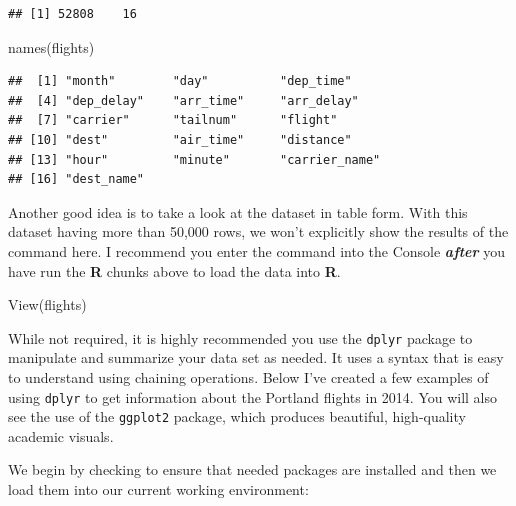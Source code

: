 \documentclass[print]{nuthesis}
\newenvironment{Shaded}{\begin{snugshade}}{\end{snugshade}}
\newcommand{\FunctionTok}[1]{\textcolor[rgb]{0.00,0.00,0.00}{#1}}
\newcommand{\NormalTok}[1]{#1}
\begin{document}
\begin{verbatim}
## [1] 52808    16
\end{verbatim}

\begin{Shaded}
\begin{Highlighting}[]
\FunctionTok{names}\NormalTok{(flights)}
\end{Highlighting}
\end{Shaded}

\begin{verbatim}
##  [1] "month"        "day"          "dep_time"    
##  [4] "dep_delay"    "arr_time"     "arr_delay"   
##  [7] "carrier"      "tailnum"      "flight"      
## [10] "dest"         "air_time"     "distance"    
## [13] "hour"         "minute"       "carrier_name"
## [16] "dest_name"
\end{verbatim}

Another good idea is to take a look at the dataset in table form. With this dataset having more than 50,000 rows, we won't explicitly show the results of the command here. I recommend you enter the command into the Console \textbf{\emph{after}} you have run the \textbf{R} chunks above to load the data into \textbf{R}.

\begin{Shaded}
\begin{Highlighting}[]
\FunctionTok{View}\NormalTok{(flights)}
\end{Highlighting}
\end{Shaded}

While not required, it is highly recommended you use the \texttt{dplyr} package to manipulate and summarize your data set as needed. It uses a syntax that is easy to understand using chaining operations. Below I've created a few examples of using \texttt{dplyr} to get information about the Portland flights in 2014. You will also see the use of the \texttt{ggplot2} package, which produces beautiful, high-quality academic visuals.

We begin by checking to ensure that needed packages are installed and then we load them into our current working environment:
\end{document}
